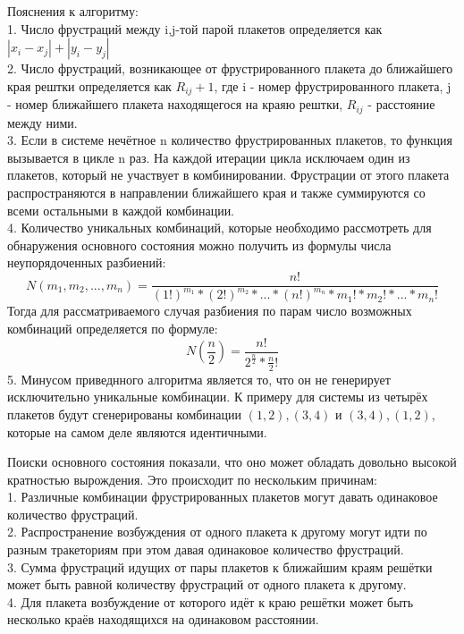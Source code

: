 \documentclass[utf8, babel, sor, jor, amsmath, amssymb, reprint]{elsarticle} %
\begin{document}
Пояснения к алгоритму:\\
1. Число фрустраций между i,j-той парой плакетов определяется как $\left|x_i-x_j\right|+\left|y_i-y_j\right|$\\
2. Число фрустраций, возникающее от фрустрированного плакета до ближайшего края рештки определяется как $R_{ij}+1$, где i - номер фрустрированного плакета, j - номер ближайшего плакета находящегося на краяю рештки, $R_{ij}$ - расстояние между ними.\\
3. Если в системе нечётное n количество фрустрированных плакетов, то функция вызывается в цикле n раз. На каждой итерации цикла исключаем один из плакетов, который не участвует в комбинировании. Фрустрации от этого плакета распространяются в направлении ближайшего края и также суммируются со всеми остальными в каждой комбинации.\\
4. Количество уникальных комбинаций, которые необходимо рассмотреть для обнаружения основного состояния можно получить из формулы числа неупорядоченных разбиений:
\begin{equation}
	N(m_1,m_2,...,m_n)=\dfrac{n!}{(1!)^{m_1}*(2!)^{m_2}*...*(n!)^{m_n}*m_1!*m_2!*...*m_n!}
	\label{eq:unordered_partitions}
\end{equation}
Тогда для рассматриваемого случая разбиения по парам число возможных комбинаций определяется по формуле:
\begin{equation}
	N(\frac{n}{2})=\dfrac{n!}{2^{\frac{n}{2}}*\frac{n}{2}!}
	\label{eq:unordered_partitions2}
\end{equation}
5. Минусом приведнного алгоритма является то, что он не генерирует исключительно уникальные комбинации. К примеру для системы из четырёх плакетов будут сгенерированы комбинации ${(1,2),(3,4)}$ и ${(3,4),(1,2)}$, которые на самом деле являются идентичными.

Поиски основного состояния показали, что оно может обладать довольно высокой кратностью вырождения. Это происходит по нескольким причинам:\\
1. Различные комбинации фрустрированных плакетов могут давать одинаковое количество фрустраций.\\
2. Распространение возбуждения от одного плакета к другому могут идти по разным тракеториям при этом давая одинаковое количество фрустраций.\\
3. Сумма фрустраций идущих от пары плакетов к ближайшим краям решётки может быть равной количеству фрустраций от одного плакета к другому.\\
4. Для плакета возбуждение от которого идёт к краю решётки может быть несколько краёв находящихся на одинаковом расстоянии.\\
\end{document}

